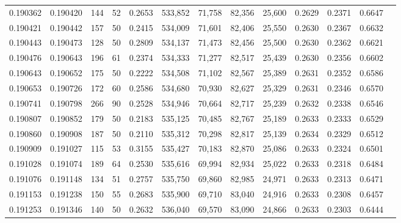 \begin{tabular}{rrrrrrrrrrrrr}
0.190362 & 0.190420 &   144 &  52 &                                     0.2653 & 533,852 &  71,758 &  82,356 &  25,600 & 0.2629 & 0.2371 & 0.6647 \\
0.190421 & 0.190442 &   157 &  50 &                                     0.2415 & 534,009 &  71,601 &  82,406 &  25,550 & 0.2630 & 0.2367 & 0.6632 \\
0.190443 & 0.190473 &   128 &  50 &                                     0.2809 & 534,137 &  71,473 &  82,456 &  25,500 & 0.2630 & 0.2362 & 0.6621 \\
0.190476 & 0.190643 &   196 &  61 &                                     0.2374 & 534,333 &  71,277 &  82,517 &  25,439 & 0.2630 & 0.2356 & 0.6602 \\
0.190643 & 0.190652 &   175 &  50 &                                     0.2222 & 534,508 &  71,102 &  82,567 &  25,389 & 0.2631 & 0.2352 & 0.6586 \\
0.190653 & 0.190726 &   172 &  60 &                                     0.2586 & 534,680 &  70,930 &  82,627 &  25,329 & 0.2631 & 0.2346 & 0.6570 \\
0.190741 & 0.190798 &   266 &  90 &                                     0.2528 & 534,946 &  70,664 &  82,717 &  25,239 & 0.2632 & 0.2338 & 0.6546 \\
0.190807 & 0.190852 &   179 &  50 &                                     0.2183 & 535,125 &  70,485 &  82,767 &  25,189 & 0.2633 & 0.2333 & 0.6529 \\
0.190860 & 0.190908 &   187 &  50 &                                     0.2110 & 535,312 &  70,298 &  82,817 &  25,139 & 0.2634 & 0.2329 & 0.6512 \\
0.190909 & 0.191027 &   115 &  53 &                                     0.3155 & 535,427 &  70,183 &  82,870 &  25,086 & 0.2633 & 0.2324 & 0.6501 \\
0.191028 & 0.191074 &   189 &  64 &                                     0.2530 & 535,616 &  69,994 &  82,934 &  25,022 & 0.2633 & 0.2318 & 0.6484 \\
0.191076 & 0.191148 &   134 &  51 &                                     0.2757 & 535,750 &  69,860 &  82,985 &  24,971 & 0.2633 & 0.2313 & 0.6471 \\
0.191153 & 0.191238 &   150 &  55 &                                     0.2683 & 535,900 &  69,710 &  83,040 &  24,916 & 0.2633 & 0.2308 & 0.6457 \\
0.191253 & 0.191346 &   140 &  50 &                                     0.2632 & 536,040 &  69,570 &  83,090 &  24,866 & 0.2633 & 0.2303 & 0.6444 \\

\end{tabular}
